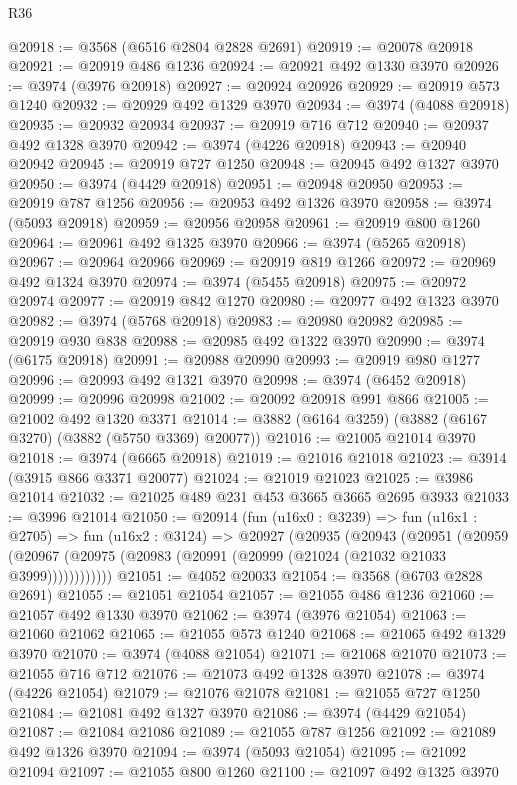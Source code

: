 \begin{lexlean}{R36}
\begin{coremodule}
@20918 := @3568 (@6516 @2804 @2828 @2691)
@20919 := @20078 @20918
@20921 := @20919 @486 @1236
@20924 := @20921 @492 @1330 @3970
@20926 := @3974 (@3976 @20918)
@20927 := @20924 @20926
@20929 := @20919 @573 @1240
@20932 := @20929 @492 @1329 @3970
@20934 := @3974 (@4088 @20918)
@20935 := @20932 @20934
@20937 := @20919 @716 @712
@20940 := @20937 @492 @1328 @3970
@20942 := @3974 (@4226 @20918)
@20943 := @20940 @20942
@20945 := @20919 @727 @1250
@20948 := @20945 @492 @1327 @3970
@20950 := @3974 (@4429 @20918)
@20951 := @20948 @20950
@20953 := @20919 @787 @1256
@20956 := @20953 @492 @1326 @3970
@20958 := @3974 (@5093 @20918)
@20959 := @20956 @20958
@20961 := @20919 @800 @1260
@20964 := @20961 @492 @1325 @3970
@20966 := @3974 (@5265 @20918)
@20967 := @20964 @20966
@20969 := @20919 @819 @1266
@20972 := @20969 @492 @1324 @3970
@20974 := @3974 (@5455 @20918)
@20975 := @20972 @20974
@20977 := @20919 @842 @1270
@20980 := @20977 @492 @1323 @3970
@20982 := @3974 (@5768 @20918)
@20983 := @20980 @20982
@20985 := @20919 @930 @838
@20988 := @20985 @492 @1322 @3970
@20990 := @3974 (@6175 @20918)
@20991 := @20988 @20990
@20993 := @20919 @980 @1277
@20996 := @20993 @492 @1321 @3970
@20998 := @3974 (@6452 @20918)
@20999 := @20996 @20998
@21002 := @20092 @20918 @991 @866
@21005 := @21002 @492 @1320 @3371
@21014 := @3882 (@6164 @3259) (@3882 (@6167 @3270) (@3882 (@5750 @3369) @20077))
@21016 := @21005 @21014 @3970
@21018 := @3974 (@6665 @20918)
@21019 := @21016 @21018
@21023 := @3914 (@3915 @866 @3371 @20077)
@21024 := @21019 @21023
@21025 := @3986 @21014
@21032 := @21025 @489 @231 @453 @3665 @3665 @2695 @3933
@21033 := @3996 @21014
@21050 := @20914
    (fun (u16x0 : @3239) =>
    fun (u16x1 : @2705) =>
    fun (u16x2 : @3124) =>
    @20927
      (@20935
        (@20943
          (@20951
            (@20959 (@20967 (@20975 (@20983 (@20991 (@20999 (@21024 (@21032 @21033 @3999))))))))))))
@21051 := @4052 @20033
@21054 := @3568 (@6703 @2828 @2691)
@21055 := @21051 @21054
@21057 := @21055 @486 @1236
@21060 := @21057 @492 @1330 @3970
@21062 := @3974 (@3976 @21054)
@21063 := @21060 @21062
@21065 := @21055 @573 @1240
@21068 := @21065 @492 @1329 @3970
@21070 := @3974 (@4088 @21054)
@21071 := @21068 @21070
@21073 := @21055 @716 @712
@21076 := @21073 @492 @1328 @3970
@21078 := @3974 (@4226 @21054)
@21079 := @21076 @21078
@21081 := @21055 @727 @1250
@21084 := @21081 @492 @1327 @3970
@21086 := @3974 (@4429 @21054)
@21087 := @21084 @21086
@21089 := @21055 @787 @1256
@21092 := @21089 @492 @1326 @3970
@21094 := @3974 (@5093 @21054)
@21095 := @21092 @21094
@21097 := @21055 @800 @1260
@21100 := @21097 @492 @1325 @3970

\end{coremodule}
\end{lexlean}
